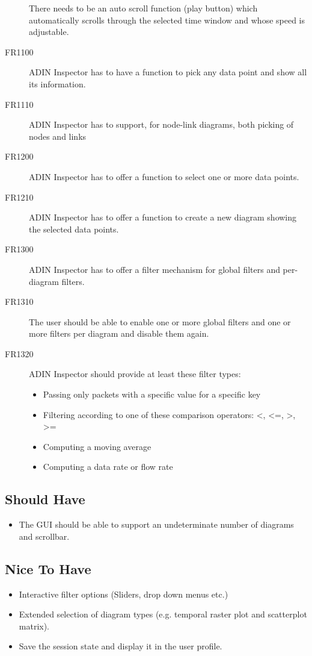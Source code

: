 \documentclass[twoside, english, draft]{Pflichtenheft}
\begin{document}
\begin{description}
	      There needs to be an auto scroll function (play button) which automatically scrolls through the selected time window and whose speed is adjustable.
	\item[FR1100]
	      ADIN Inspector has to have a function to pick any data point and show all its information.
	\item[FR1110]
	      ADIN Inspector has to support, for node-link diagrams, both picking of nodes and links
	\item[FR1200]
	      ADIN Inspector has to offer a function to select one or more data points.
	\item[FR1210]
	      ADIN Inspector has to offer a function to create a new diagram showing the selected data points.

	\item[FR1300]
	      ADIN Inspector has to offer a filter mechanism for global filters and per-diagram filters.

	\item[FR1310]
	      The user should be able to enable one or more global filters and one or more filters per diagram and disable them again.

	\item[FR1320]
	      ADIN Inspector should provide at least these filter types:
	      \begin{itemize}
		      \item{Passing only packets with a specific value for a specific key}
		      \item{Filtering according to one of these comparison operators: <, <=, >, >=}
		      \item{Computing a moving average}
		      \item{Computing a data rate or flow rate}
	      \end{itemize}

\end{description}

\subsection{Should Have}
\begin{itemize}
	\item{The GUI should be able to support an undeterminate number of diagrams and scrollbar.}
\end{itemize}
\subsection{Nice To Have}
\begin{itemize}
	\item{Interactive filter options (Sliders, drop down menus etc.)}
	\item{Extended selection of diagram types (e.g. temporal raster plot and scatterplot matrix).}
	\item{Save the session state and display it in the user profile.}

\end{itemize}
\end{document}
